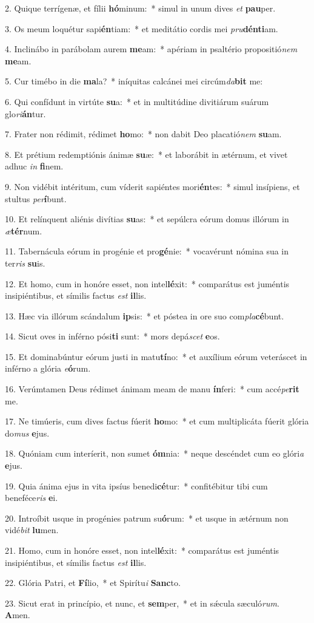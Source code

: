 2. Quique terrígenæ, et fílii \textbf{hó}minum:~*  simul in unum dives \textit{et} \textbf{pau}per.\

3. Os meum loquétur sapi\textbf{én}tiam:~*  et meditátio cordis mei \textit{pru}\textbf{dén}\textbf{ti}am.\

4. Inclinábo in parábolam aurem \textbf{me}am:~*  apériam in psaltério propositió\textit{nem} \textbf{me}am.\

5. Cur timébo in die \textbf{ma}la?~*  iníquitas calcánei mei circúm\textit{da}\textbf{bit} me:\

6. Qui confídunt in virtúte \textbf{su}a:~*  et in multitúdine divitiárum suárum glo\textit{ri}\textbf{án}tur.\

7. Frater non rédimit, rédimet \textbf{ho}mo:~*  non dabit Deo placatió\textit{nem} \textbf{su}am.\

8. Et prétium redemptiónis ánimæ \textbf{su}æ:~*  et laborábit in ætérnum, et vivet adhuc \textit{in} \textbf{fi}nem.\

9. Non vidébit intéritum, cum víderit sapiéntes mori\textbf{én}tes:~*  simul insípiens, et stultus \textit{per}\textbf{í}bunt.\

10. Et relínquent aliénis divítias \textbf{su}as:~*  et sepúlcra eórum domus illórum in \textit{æ}\textbf{tér}num.\

11. Tabernácula eórum in progénie et pro\textbf{gé}nie:~*  vocavérunt nómina sua in ter\textit{ris} \textbf{su}is.\

12. Et homo, cum in honóre esset, non intel\textbf{lé}xit:~*  comparátus est juméntis insipiéntibus, et símilis factus \textit{est} \textbf{il}lis.\

13. Hæc via illórum scándalum \textbf{ip}sis:~*  et póstea in ore suo com\textit{pla}\textbf{cé}bunt.\

14. Sicut oves in inférno pósi\textbf{ti} sunt:~*  mors depá\textit{scet} \textbf{e}os.\

15. Et dominabúntur eórum justi in matu\textbf{tí}no:~*  et auxílium eórum veteráscet in inférno a glória \textit{e}\textbf{ó}rum.\

16. Verúmtamen Deus rédimet ánimam meam de manu \textbf{ín}feri:~*  cum accé\textit{pe}\textbf{rit} me.\

17. Ne timúeris, cum dives factus fúerit \textbf{ho}mo:~*  et cum multiplicáta fúerit glória do\textit{mus} \textbf{e}jus.\

18. Quóniam cum interíerit, non sumet \textbf{óm}nia:~*  neque descéndet cum eo glóri\textit{a} \textbf{e}jus.\

19. Quia ánima ejus in vita ipsíus benedi\textbf{cé}tur:~*  confitébitur tibi cum beneféce\textit{ris} \textbf{e}i.\

20. Introíbit usque in progénies patrum su\textbf{ó}rum:~*  et usque in ætérnum non vidé\textit{bit} \textbf{lu}men.\

21. Homo, cum in honóre esset, non intel\textbf{lé}xit:~*  comparátus est juméntis insipiéntibus, et símilis factus \textit{est} \textbf{il}lis.\

22. Glória Patri, et \textbf{Fí}lio,~*  et Spirítu\textit{i} \textbf{Sanc}to.\

23. Sicut erat in princípio, et nunc, et \textbf{sem}per,~*  et in sǽcula sæculó\textit{rum}. \textbf{A}men.\

